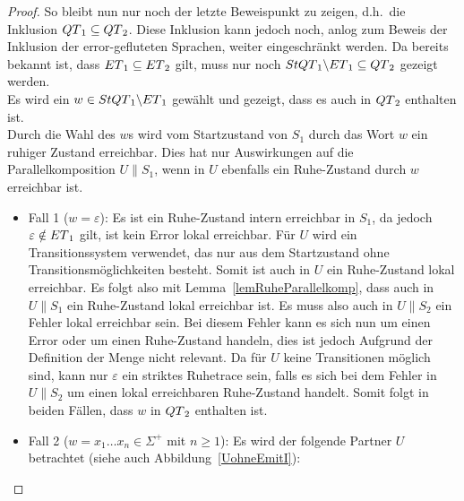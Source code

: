 \begin{proof}
  So bleibt nun nur noch der letzte Beweispunkt zu zeigen, d.h.\ die Inklusion
  $QT{}_1\subseteq QT{}_2$. Diese Inklusion kann jedoch noch, anlog zum Beweis
  der Inklusion der error-gefluteten Sprachen, weiter eingeschränkt werden.
  Da bereits bekannt ist, dass $ET{}_1\subseteq ET{}_2$ gilt, muss nur
  noch $StQT{}_1\backslash ET{}_1\subseteq QT{}_2$ gezeigt werden.\\
  Es wird ein $w\in StQT{}_1\backslash ET{}_1$ gewählt und gezeigt, dass
  es auch in $QT{}_2$ enthalten ist.\\
  Durch die Wahl des $w$s wird vom Startzustand von $S_1$ durch das Wort $w$
  ein ruhiger Zustand erreichbar. Dies hat nur Auswirkungen auf die
  Parallelkomposition $U\|S_1$, wenn in $U$ ebenfalls ein Ruhe-Zustand durch
  $w$ erreichbar ist.
  \begin{itemize}
    \item Fall 1 ($w=\varepsilon$): Es ist ein Ruhe-Zustand intern erreichbar in
      $S_1$, da jedoch $\varepsilon\notin ET{}_1$ gilt, ist kein Error
      lokal erreichbar. Für $U$ wird ein Transitionssystem verwendet, das nur
      aus dem Startzustand ohne Transitionsmöglichkeiten besteht. Somit ist
      auch in $U$ ein Ruhe-Zustand lokal erreichbar. Es
      folgt also mit Lemma~\ref{lemRuheParallelkomp}, dass auch in $U\|S_1$ ein
      Ruhe-Zustand lokal erreichbar ist. Es muss also auch in
      $U\|S_2$ ein Fehler lokal erreichbar sein. Bei diesem Fehler kann es sich
      nun um einen Error oder um einen Ruhe-Zustand handeln, dies ist jedoch
      Aufgrund der Definition der Menge \QT{} nicht relevant. Da für $U$ keine
      Transitionen möglich sind, kann nur $\varepsilon$ ein striktes
      Ruhetrace sein, falls es sich bei dem Fehler in $U\|S_2$ um einen lokal
      erreichbaren Ruhe-Zustand handelt. Somit folgt in
      beiden Fällen, dass $w$ in $QT{}_2$ enthalten ist.
    \item Fall 2 ($w=x_1\dots x_n\in \Sigma ^+$ mit $n\geq 1$): Es wird der
      folgende Partner $U$ betrachtet (siehe auch Abbildung~\ref{UohneEmitI}):
\end{itemize}
\end{proof}
